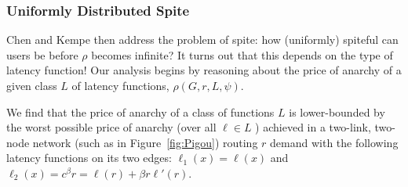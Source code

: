 \subsubsection{Uniformly Distributed Spite}
Chen and Kempe then address the problem of spite: how (uniformly) spiteful can users be before $\rho$ becomes infinite?
It turns out that this depends on the type of latency function! Our analysis begins by reasoning about the price of anarchy of a given class ${L}$ of latency functions, 
$\rho(G,r,{L},\psi)$.

We find that the price of anarchy of a class of functions $L$ is lower-bounded by the worst possible price of anarchy (over all $\ell \in L$ ) achieved in a two-link, two-node network (such as in Figure~\ref{fig:Pigou}) routing $r$ demand with the following latency functions on its two edges:
$\ell_1(x) = \ell(x)$ and $\ell_2(x) = c^\beta{r} = \ell(r) +\beta r\ell'(r)$.

